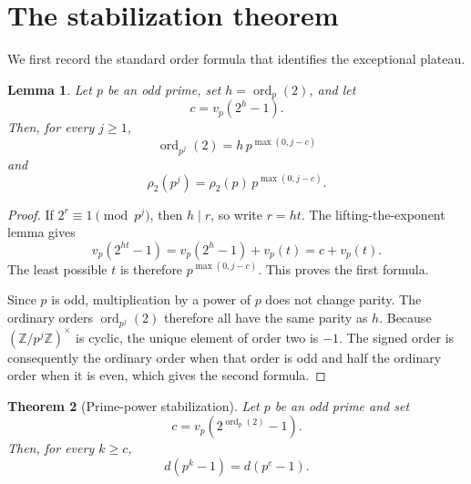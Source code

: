 \documentclass[a4paper]{article}
\newtheorem{theorem}{Theorem}[section]
\newtheorem{lemma}[theorem]{Lemma}
\newcommand{\ord}[2][]{\operatorname{ord}_{#1}\!\left(#2\right)}
\begin{document}
\section{The stabilization theorem}

We first record the standard order formula that identifies the exceptional plateau.

\begin{lemma}\label{lem:orders}
	Let $p$ be an odd prime, set $h=\ord[p]{2}$, and let
	\[
		c=v_p(2^h-1).
	\]
	Then, for every $j\geq1$,
	\[
		\ord[p^j]{2}=h\,p^{\max(0,j-c)}
	\]
	and
	\[
		\rho_2(p^j)=\rho_2(p)\,p^{\max(0,j-c)}.
	\]
\end{lemma}

\begin{proof}
	If $2^r\equiv1\pmod{p^j}$, then $h\mid r$, so write $r=ht$.
	The lifting-the-exponent lemma gives
	\[
		v_p(2^{ht}-1)=v_p(2^h-1)+v_p(t)=c+v_p(t).
	\]
	The least possible $t$ is therefore $p^{\max(0,j-c)}$.
	This proves the first formula.

	Since $p$ is odd, multiplication by a power of $p$ does not change parity.
	The ordinary orders $\ord[p^j]{2}$ therefore all have the same parity as $h$.
	Because $(\mathbb{Z}/p^j\mathbb{Z})^\times$ is cyclic, the unique element of order two is $-1$.
	The signed order is consequently the ordinary order when that order is odd and half the ordinary order when it is even, which gives the second formula.
\end{proof}

\begin{theorem}[Prime-power stabilization]\label{thm:stabilization}
	Let $p$ be an odd prime and set
	\[
		c=v_p\!\left(2^{\ord[p]{2}}-1\right).
	\]
	Then, for every $k\geq c$,
	\[
		d(p^k-1)=d(p^c-1).
	\]
\end{theorem}
\end{document}
